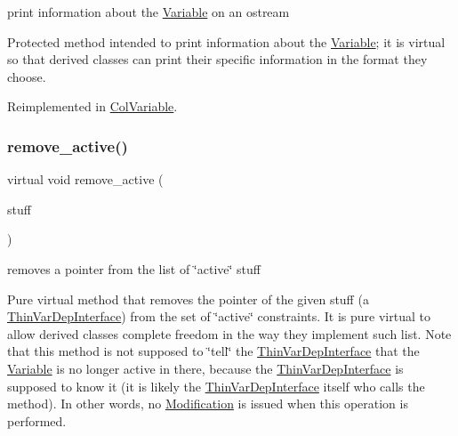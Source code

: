 print information about the \mbox{\hyperlink{class_s_m_spp__di__unipi__it_1_1_variable}{Variable}} on an ostream 

Protected method intended to print information about the \mbox{\hyperlink{class_s_m_spp__di__unipi__it_1_1_variable}{Variable}}; it is virtual so that derived classes can print their specific information in the format they choose. 

Reimplemented in \mbox{\hyperlink{class_s_m_spp__di__unipi__it_1_1_col_variable_a59a9fcbf8f9f86d348344b2073644b0e}{Col\+Variable}}.

\mbox{\label{class_s_m_spp__di__unipi__it_1_1_variable_a2e531111ee80083b60e8b3775ad3ce4f}} 
\subsubsection{\texorpdfstring{remove\+\_\+active()}{remove\_active()}}
{\footnotesize\ttfamily virtual void remove\+\_\+active (\begin{DoxyParamCaption}\item[{\mbox{\hyperlink{class_s_m_spp__di__unipi__it_1_1_thin_var_dep_interface}{Thin\+Var\+Dep\+Interface}} $\ast$}]{stuff }\end{DoxyParamCaption})\hspace{0.3cm}{\ttfamily [pure virtual]}}



removes a pointer from the list of \char`\"{}active\char`\"{} stuff 

Pure virtual method that removes the pointer of the given stuff (a \mbox{\hyperlink{class_s_m_spp__di__unipi__it_1_1_thin_var_dep_interface}{Thin\+Var\+Dep\+Interface}}) from the set of \char`\"{}active\char`\"{} constraints. It is pure virtual to allow derived classes complete freedom in the way they implement such list. Note that this method is not supposed to \char`\"{}tell\char`\"{} the \mbox{\hyperlink{class_s_m_spp__di__unipi__it_1_1_thin_var_dep_interface}{Thin\+Var\+Dep\+Interface}} that the \mbox{\hyperlink{class_s_m_spp__di__unipi__it_1_1_variable}{Variable}} is no longer active in there, because the \mbox{\hyperlink{class_s_m_spp__di__unipi__it_1_1_thin_var_dep_interface}{Thin\+Var\+Dep\+Interface}} is supposed to know it (it is likely the \mbox{\hyperlink{class_s_m_spp__di__unipi__it_1_1_thin_var_dep_interface}{Thin\+Var\+Dep\+Interface}} itself who calls the method). In other words, no \mbox{\hyperlink{class_s_m_spp__di__unipi__it_1_1_modification}{Modification}} is issued when this operation is performed. 

